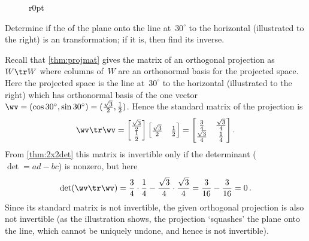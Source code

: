 \begin{figure}[5]r{0pt}
\end{figure}
\begin{example} 
Determine if the  of the plane onto the line at~\(30^\circ\) to the horizontal (illustrated to the right) is an  transformation; if it is, then find its inverse.

\begin{solution} 
Recall that \cref{thm:projmat} gives the matrix of an orthogonal projection as~\(W\tr W\) where columns of~\(W\) are an orthonormal basis for the projected space.
Here the projected space is the line at~\(30^\circ\) to the horizontal (illustrated to the right) which has orthonormal basis of the one vector \(\wv=(\cos 30^\circ,\sin 30^\circ)=(\tfrac{\sqrt3}2,\tfrac12)\).
Hence the standard matrix of the projection is
\begin{equation*}
\wv\tr\wv=\begin{bmatrix} \tfrac{\sqrt3}2\\\tfrac12 \end{bmatrix}
\begin{bmatrix} \tfrac{\sqrt3}2&\tfrac12 \end{bmatrix}
=\begin{bmatrix} \tfrac34&\tfrac{\sqrt3}4\\
\tfrac{\sqrt3}4&\tfrac14 \end{bmatrix}.
\end{equation*}
From \cref{thm:2x2det} this matrix is invertible only if the determinant (\(\det=ad-bc\)) is nonzero, but here
\begin{equation*}
\det(\wv\tr\wv)=\frac34\cdot\frac14-\frac{\sqrt3}4\cdot\frac{\sqrt3}4
=\frac3{16}-\frac3{16}=0\,.
\end{equation*}
Since its standard matrix is not invertible, the given orthogonal projection is also not invertible (as the illustration shows, the projection `squashes' the plane onto the line, which cannot be uniquely undone, and hence is not invertible).
\end{solution}
\end{example}







%



